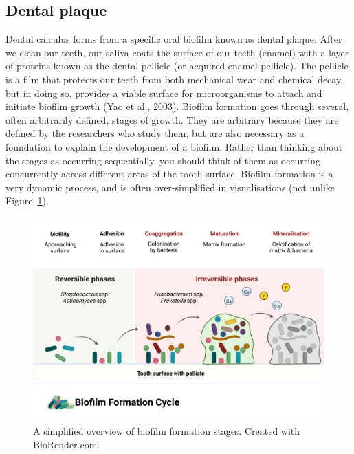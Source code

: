 \documentclass[
  b5paper,
]{book}
\begin{document}
\hypertarget{dental-plaque}{%
\subsection{Dental plaque}\label{dental-plaque}}

Dental calculus forms from a specific oral biofilm known as dental
plaque. After we clean our teeth, our saliva coats the surface of our
teeth (enamel) with a layer of proteins known as the dental pellicle (or
acquired enamel pellicle). The pellicle is a film that protects our
teeth from both mechanical wear and chemical decay, but in doing so,
provides a viable surface for microorganisms to attach and initiate
biofilm growth (\protect\hyperlink{ref-yaoIdentificationProtein2003}{Yao
et al., 2003}). Biofilm formation goes through several, often
arbitrarily defined, stages of growth. They are arbitrary because they
are defined by the researchers who study them, but are also necessary as
a foundation to explain the development of a biofilm. Rather than
thinking about the stages as occurring sequentially, you should think of
them as occurring concurrently across different areas of the tooth
surface. Biofilm formation is a very dynamic process, and is often
over-simplified in visualisations (not unlike
Figure~\ref{fig-biofilm-form}).

\begin{figure}

{\centering \includegraphics{./figures/biofilm_formation.png}

}

\caption{\label{fig-biofilm-form}A simplified overview of biofilm
formation stages. Created with BioRender.com.}

\end{figure}
\end{document}
